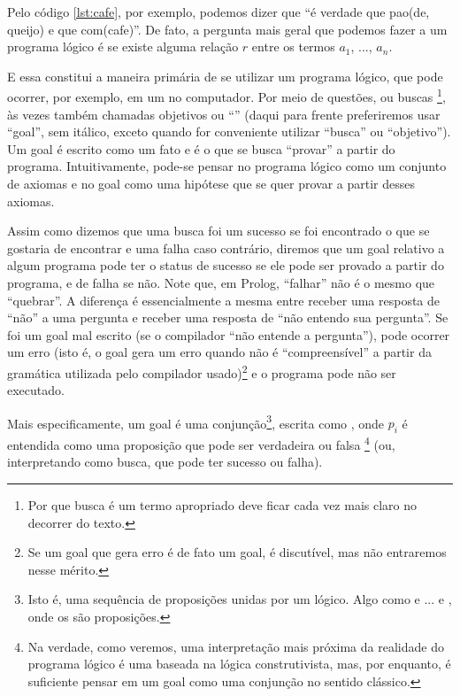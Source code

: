 %
\inputminted{prolog}{../Exemplos/Cap0/prog2_queijo.pl}\label{lst:queijo}

Pelo código \ref{lst:cafe}, por exemplo, podemos dizer que ``é verdade que pao(de, queijo) e que com(cafe)''. De fato, a pergunta mais
geral que podemos fazer a um programa lógico é se existe alguma relação $r$ entre os termos $a_1$, ..., $a_n$.

E essa constitui a maneira primária de se utilizar um programa lógico, que pode ocorrer, por
exemplo, em um  no computador. Por meio de questões, ou buscas \footnote{Por que
  busca é um termo apropriado deve ficar cada vez mais claro no decorrer do texto.}, às vezes também
chamadas objetivos ou ``'' (daqui para frente preferiremos usar ``goal'', sem
itálico, exceto quando for conveniente utilizar ``busca'' ou ``objetivo''). Um goal é escrito como
um fato e é o que se busca ``provar'' a partir do programa. Intuitivamente, pode-se pensar no
programa lógico como um conjunto de axiomas e no goal como uma hipótese que se quer provar a partir desses axiomas.

Assim como dizemos que uma busca foi um sucesso se foi encontrado o que se gostaria de encontrar e uma falha caso contrário,
diremos que um goal relativo a algum programa pode ter o status de sucesso se ele pode ser provado a partir do programa, e de
falha se não. Note que, em Prolog, ``falhar'' não é o mesmo que ``quebrar''. A diferença é
essencialmente a mesma entre receber uma resposta de ``não'' a uma pergunta e receber uma resposta de
``não entendo sua pergunta''.  Se foi um goal mal escrito (se o compilador ``não entende a
pergunta''), pode ocorrer um erro (isto é, o goal gera um erro quando não é ``compreensível'' a
partir da gramática utilizada pelo compilador usado)\footnote{Se um goal que gera erro é de fato um
  goal, é discutível, mas não entraremos nesse mérito.} e o programa pode não ser executado.

Mais especificamente, um goal é uma conjunção\footnote{Isto é, uma sequência de proposições unidas
  por um  lógico. Algo como  e
  ... e , onde os  são proposições.}, escrita como , onde $p_i$ é
entendida como uma proposição que pode ser verdadeira ou falsa \footnote{Na verdade, como veremos,
  uma interpretação mais próxima da realidade do programa lógico é uma baseada na lógica
  construtivista, mas, por enquanto, é suficiente pensar em um goal como uma conjunção no sentido
  clássico.} (ou, interpretando como busca, que pode ter sucesso ou falha).

